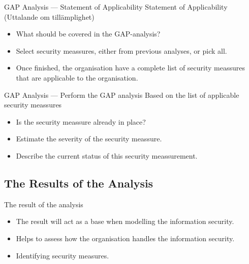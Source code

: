 \documentclass{beamer}
\begin{document}
\begin{frame}{GAP Analysis --- Statement of Applicability}
  Statement of Applicability (Uttalande om tillämplighet)
  \begin{itemize}
    \item What should be covered in the GAP-analysis?
    \item Select security meassures, either from previous analyses, or pick all.  
    \item Once finished, the organisation have a complete list of security
      meassures that are applicable to the organisation.
  \end{itemize}
\end{frame}
\begin{frame}{GAP Analysis --- Perform the GAP analysis}
  Based on the list of applicable security meassures
  \begin{itemize}
    \item Is the security meassure already in place?
    \item Estimate the severity of the security meassure.
    \item Describe the current status of this security meassurement.
  \end{itemize}
\end{frame}
\subsection{The Results of the Analysis}
\begin{frame}{The result of the analysis}
  \begin{itemize}
    \item The result will act as a base when modelling the information security.
    \item Helps to assess how the organisation handles the information security.
    \item Identifying security measures.
  \end{itemize}
  
\end{frame}
\end{document}
